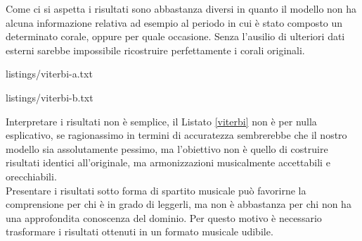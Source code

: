 \noindent
Come ci si aspetta i risultati sono abbastanza diversi in quanto il modello non ha alcuna informazione relativa ad esempio al periodo in cui è stato composto un determinato corale, oppure per quale occasione. Senza l'ausilio di ulteriori dati esterni sarebbe impossibile ricostruire perfettamente i corali originali.
\begin{center}
	\begin{minipage}[h]{.45\textwidth}
		
		{listings/viterbi-a.txt}
	\end{minipage}
	\hspace{.5cm}
	\begin{minipage}[h]{.45\textwidth}
		
		{listings/viterbi-b.txt}
	\end{minipage}
	\label{viterbi}
\end{center}
Interpretare i risultati non è semplice, il Listato \ref{viterbi} non è per nulla esplicativo, se ragionassimo in termini di accuratezza sembrerebbe che il nostro modello sia assolutamente pessimo, ma l'obiettivo non è quello di costruire risultati identici all'originale, ma armonizzazioni musicalmente accettabili e orecchiabili. \\
Presentare i risultati sotto forma di spartito musicale può favorirne la comprensione per chi è in grado di leggerli, ma non è abbastanza per chi non ha una approfondita conoscenza del dominio. Per questo motivo è necessario trasformare i risultati ottenuti in un formato musicale udibile.

